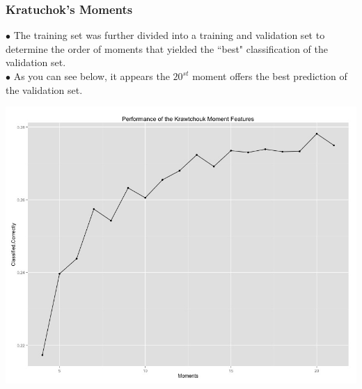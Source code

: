 \documentclass{beamer}
\begin{document}
\begin{frame}
\frametitle{Kratuchok's Moments}
$\bullet$ The training set was further divided into a training and validation set to determine the order of moments that yielded the ``best" classification of the validation set. \\
$\bullet$ As you can see below, it appears the $20^{st}$ moment offers the best prediction of the validation set.
	\begin{center}
		\includegraphics[scale=0.20]{PerfPlot.jpeg}
	\end{center}
\end{frame}

\end{document}
